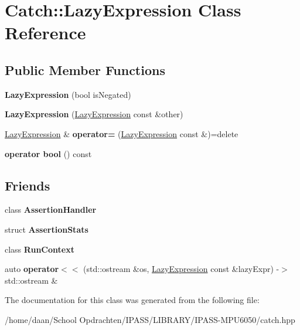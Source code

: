 \hypertarget{classCatch_1_1LazyExpression}{}\section{Catch\+:\+:Lazy\+Expression Class Reference}
\label{classCatch_1_1LazyExpression}
\subsection*{Public Member Functions}
\begin{DoxyCompactItemize}
\item 
\mbox{\label{classCatch_1_1LazyExpression_a47186c2487bd4bf871e870ba8048553a}} 
{\bfseries Lazy\+Expression} (bool is\+Negated)
\item 
\mbox{\label{classCatch_1_1LazyExpression_ab82d5e94df0e159b018fbde0170e46f8}} 
{\bfseries Lazy\+Expression} (\hyperlink{classCatch_1_1LazyExpression}{Lazy\+Expression} const \&other)
\item 
\mbox{\label{classCatch_1_1LazyExpression_ae4ae00d4f36f084c369f2da36565a822}} 
\hyperlink{classCatch_1_1LazyExpression}{Lazy\+Expression} \& {\bfseries operator=} (\hyperlink{classCatch_1_1LazyExpression}{Lazy\+Expression} const \&)=delete
\item 
\mbox{\label{classCatch_1_1LazyExpression_acdb846cb230cecfc6aca7a925b31fbca}} 
{\bfseries operator bool} () const
\end{DoxyCompactItemize}
\subsection*{Friends}
\begin{DoxyCompactItemize}
\item 
\mbox{\label{classCatch_1_1LazyExpression_a4301a3aa57b612dd8b6ef8461742ecab}} 
class {\bfseries Assertion\+Handler}
\item 
\mbox{\label{classCatch_1_1LazyExpression_a64019eb137f5ce447cdc71cb80b6e7a4}} 
struct {\bfseries Assertion\+Stats}
\item 
\mbox{\label{classCatch_1_1LazyExpression_af3aa096bb29a772bc534830f29a2ce7a}} 
class {\bfseries Run\+Context}
\item 
\mbox{\label{classCatch_1_1LazyExpression_aa01086581cab2fcd2d4580b8fa787dfc}} 
auto {\bfseries operator$<$$<$} (std\+::ostream \&os, \hyperlink{classCatch_1_1LazyExpression}{Lazy\+Expression} const \&lazy\+Expr) -\/$>$ std\+::ostream \&
\end{DoxyCompactItemize}


The documentation for this class was generated from the following file\+:\begin{DoxyCompactItemize}
\item 
/home/daan/\+School Opdrachten/\+I\+P\+A\+S\+S/\+L\+I\+B\+R\+A\+R\+Y/\+I\+P\+A\+S\+S-\/\+M\+P\+U6050/catch.\+hpp\end{DoxyCompactItemize}
